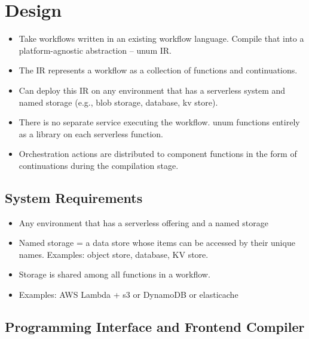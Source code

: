\section{Design}\label{sec:design}

\begin{itemize}
	\item Take workflows written in an existing workflow language. Compile
	that into a platform-agnostic abstraction -- unum IR.

	\item The IR represents a workflow as a collection of functions and
	continuations.

	\item Can deploy this IR on any environment that has a serverless system
	and named storage (e.g., blob storage, database, kv store).

	\item There is no separate service executing the workflow. unum functions
	entirely as a library on each serverless function.

	\item Orchestration actions are distributed to component functions in the
	form of continuations during the compilation stage.

\end{itemize}



\subsection{System Requirements}

\begin{itemize}
	\item Any environment that has a serverless offering and a named storage
	\item Named storage = a data store whose items can be accessed by their
	unique names. Examples: object store, database, KV store.
	\item Storage is shared among all functions in a workflow.
	\item Examples: AWS Lambda + s3 or DynamoDB or elasticache
\end{itemize} 



\subsection{Programming Interface and Frontend Compiler}


